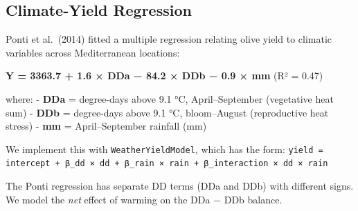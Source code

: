 \subsection{Climate-Yield Regression}



\label{10133016477688417965}{}


Ponti et al.~(2014) fitted a multiple regression relating olive yield to climatic variables across Mediterranean locations:



\textbf{Y = 3363.7 + 1.6 × DDa − 84.2 × DDb − 0.9 × mm} (R² = 0.47)



where: - \textbf{DDa} = degree-days above 9.1 °C, April–September (vegetative heat sum) - \textbf{DDb} = degree-days above 9.1 °C, bloom–August (reproductive heat stress) - \textbf{mm} = April–September rainfall (mm)



We implement this with \texttt{WeatherYieldModel}, which has the form: \texttt{yield = intercept + β\_dd × dd + β\_rain × rain + β\_interaction × dd × rain}



The Ponti regression has separate DD terms (DDa and DDb) with different signs. We model the \emph{net} effect of warming on the DDa − DDb balance.




